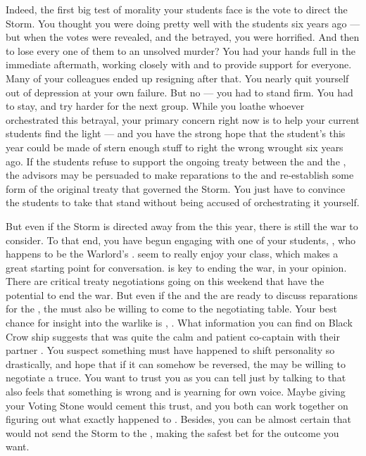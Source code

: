 \documentclass[char]{GL2020}
\begin{document}
Indeed, the first big test of morality your students face is the vote to direct the Storm. You thought you were doing pretty well with the students six years ago — but when the votes were revealed, and the \pShip{} betrayed, you were horrified. And then to lose every one of them to an unsolved murder? You had your hands full in the immediate aftermath, working closely with \cFlowPriest{\full} and \cMusic{\full} to provide support for everyone. Many of your colleagues ended up resigning after that. You nearly quit yourself out of depression at your own failure. But no — you had to stand firm. You had to stay, and try harder for the next group. While you loathe whoever orchestrated this betrayal, your primary concern right now is to help your current students find the light — and you have the strong hope that the student's this year could be made of stern enough stuff to right the wrong wrought six years ago. If the students refuse to support the ongoing treaty between the \pFarm{} and the \pTech{}, the advisors may be persuaded to make reparations to the \pShip{} and re-establish some form of the original treaty that governed the Storm. You just have to convince the students to take that stand without being accused of orchestrating it yourself.

But even if the Storm is directed away from the \pShip{} this year, there is still the war to consider. To that end, you have begun engaging with one of your \pShippie{} students, \cWarlordDaughter{\full}, who happens to be the Warlord's \cWarlordDaughter{\offspring}. \cWarlordDaughter{\They} seem\cWarlordDaughter{\verbs} to really enjoy your class, which makes a great starting point for conversation. \cWarlordDaughter{} is key to ending the war, in your opinion. There are critical treaty negotiations going on this weekend that have the potential to end the war. But even if the \pFarm{} and the \pTech{} are ready to discuss reparations for the \pShippies{}, the \pShip{} must also be willing to come to the negotiating table. Your best chance for insight into the warlike \cLoud{\full} is \cLoud{\their} \cWarlordDaughter{\offspring}, \cWarlordDaughter{}. What information you can find on Black Crow ship suggests that \cLoud{} was quite the calm and patient co-captain with their partner \cQuiet{\full}. You suspect something must have happened to shift \cLoud{\their} personality so drastically, and hope that if it can somehow be reversed, the \pShip{} may be willing to negotiate a truce. You want \cWarlordDaughter{} to trust you as you can tell just by talking to \cWarlordDaughter{\them} that \cWarlordDaughter{\they} also feels that something is wrong and is yearning for  own voice. Maybe giving \cWarlordDaughter{} your Voting Stone would cement this trust, and you both can work together on figuring out what exactly happened to \cLoud{}. Besides, you can be almost certain that \cWarlordDaughter{} would not send the Storm to the \pShip{}, making \cWarlordDaughter{} the safest bet for the outcome you want.  
\end{document}
